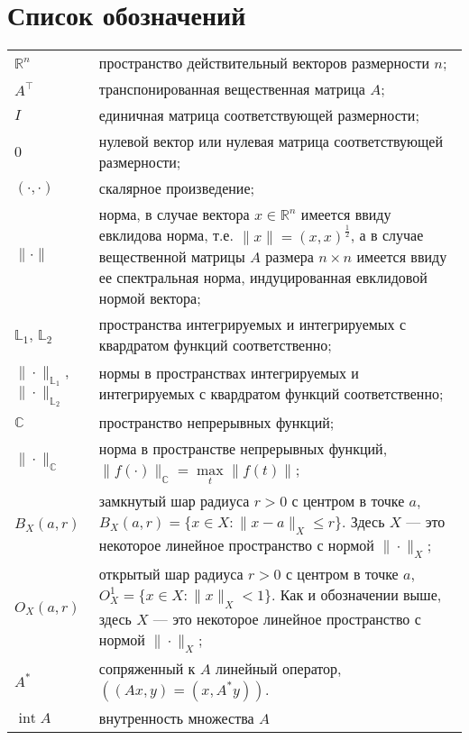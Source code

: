 \documentclass[../main.tex]{subfiles}
\begin{document}
\clearpage
\section*{Список обозначений}
\begin{tabularx}{\textwidth}{lY}
	$\mathbb{R}^n$ & пространство действительный векторов размерности $n$; \\ 
	$A^{\top}$ & транспонированная вещественная матрица $A$; \\ 
	$I$ & единичная матрица соответствующей размерности; \\ 
	$0$ & нулевой вектор или нулевая матрица соответствующей размерности; \\
	$(\cdot,\cdot)$ & скалярное произведение; \\
	$\| \cdot\| $ &  норма, в случае вектора $x \in \mathbb{R}^n$ имеется ввиду евклидова норма,  т.е. $\|x\| = (x,x)^{\frac{1}{2}}$, а в случае вещественной  матрицы $A$ размера $n \times n$ имеется ввиду ее спектральная норма, индуцированная евклидовой нормой вектора; \\
	$\mathbb{L}_1$, $\mathbb{L}_2$ & пространства интегрируемых и интегрируемых с квардратом функций соответственно; \\
	$\|\cdot\|_{\mathbb{L}_1}$, $\|\cdot\|_{\mathbb{L}_2}$ & нормы в пространствах интегрируемых и интегрируемых с квардратом функций соответственно; \\
	$ \mathbb{C} $ & пространство непрерывных функций; \\
	$\|\cdot\|_\mathbb{C}$ & норма в пространстве непрерывных функций, $\|f(\cdot) \|_\mathbb{C} = \max\limits_{t} \|f(t)\|$; \\
	$B_X(a,r)$ & замкнутый шар радиуса $r>0$ с центром в точке $a$, $B_X(a, r) = \{x\in X: \|x-a\|_X \leqslant r \}$. Здесь $X$ --- это некоторое линейное пространство с нормой $\|\cdot\|_X$; \\
	$O_{X}(a, r)$  & открытый шар радиуса $r>0$ с центром в точке $a$, $O_{X}^1 = \{x\in X: \|x\|_{X} < 1 \}$. Как и обозначении выше, здесь $X$ --- это некоторое линейное пространство с нормой $\|\cdot\|_X$; \\
	$ A^* $ & сопряженный к $A$ линейный оператор, $((Ax, y) = (x, A^*y))$. \\
	$ \operatorname{int}A $   & внутренность множества $A$ \\
\end{tabularx}
\end{document}
